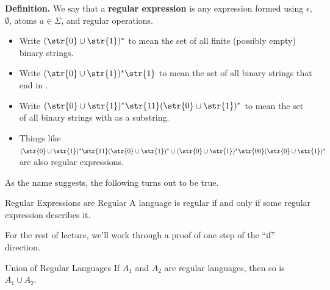 \textbf{Definition.}
We say that a \textbf{regular expression}
is any expression formed using $\epsilon$, $\emptyset$,
atoms $a \in \Sigma$, and regular operations.
\begin{itemize}
    \item Write $(\str{0} \cup \str{1})^*$
    to mean the set of all finite (possibly empty) binary strings.
    \item Write $(\str{0} \cup \str{1})^*\str{1}$
    to mean the set of all binary strings that end in .
    \item Write $(\str{0} \cup \str{1})^*\str{11}(\str{0} \cup \str{1})^*$
    to mean the set of all binary strings with  as a substring.
    \item Things like
    $(\str{0} \cup \str{1})^*\str{11}(\str{0} \cup \str{1})^*
    \cup (\str{0} \cup \str{1})^*\str{00}(\str{0} \cup \str{1})^*$
    are also regular expressions.
\end{itemize}
As the name suggests, the following turns out to be true.

\begin{theorem}{Regular Expressions are Regular}
    A language is regular if and only if some regular expression describes it.
\end{theorem}

For the rest of lecture,
we'll work through a proof of one step of the ``if'' direction.

\begin{theorem}{Union of Regular Languages}
    If $A_1$ and $A_2$ are regular languages,
    then so is $A_1 \cup A_2$.
\end{theorem}

